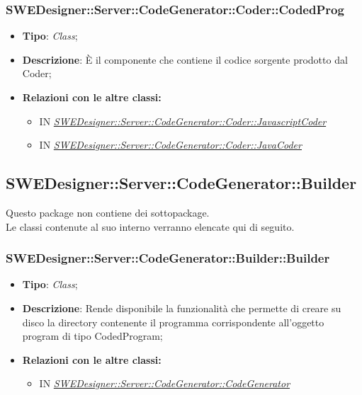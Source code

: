 \documentclass[../SpecificaTecnica.tex]{subfiles}
\begin{document}
			
			\subsubsection{SWEDesigner::Server::CodeGenerator::Coder::CodedProg}
			\hypertarget{SWEDesigner::Server::CodeGenerator::Coder::CodedProg}{}
			\begin{itemize}
				\item \textbf{Tipo}: \emph{Class};
				\item \textbf{Descrizione}: È il componente che contiene il codice sorgente prodotto dal Coder; 
				\item \textbf{Relazioni con le altre classi:}
				\begin{itemize}
					\item IN \hyperlink{SWEDesigner::Server::CodeGenerator::Coder::JavascriptCoder}{\emph{SWEDesigner::Server::CodeGenerator::Coder::JavascriptCoder}}
					\item IN \hyperlink{SWEDesigner::Server::CodeGenerator::Coder::JavaCoder}{\emph{SWEDesigner::Server::CodeGenerator::Coder::JavaCoder}}
				\end{itemize}	
			\end{itemize}
			
			
			\subsection{SWEDesigner::Server::CodeGenerator::Builder}
			Questo package non contiene dei sottopackage.\\
			Le classi contenute al suo interno verranno elencate qui di seguito.
			
			
			\subsubsection{SWEDesigner::Server::CodeGenerator::Builder::Builder}
			\hypertarget{SWEDesigner::Server::CodeGenerator::Builder::Builder}{}
			\begin{itemize}
				\item \textbf{Tipo}: \emph{Class};
				\item \textbf{Descrizione}: Rende disponibile la funzionalità che permette di creare su disco la directory contenente il programma corrispondente all'oggetto program di tipo CodedProgram; 
				\item \textbf{Relazioni con le altre classi:}
				\begin{itemize}
					\item IN \hyperlink{SWEDesigner::Server::CodeGenerator::CodeGenerator}{\emph{SWEDesigner::Server::CodeGenerator::CodeGenerator}}
				\end{itemize}	
			\end{itemize}
			
\end{document}
